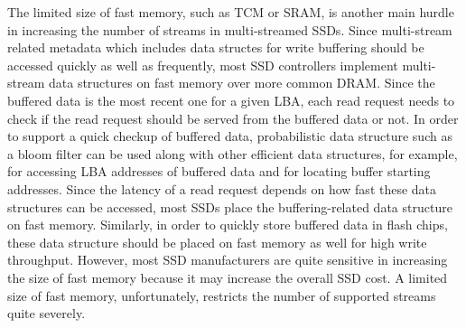 The limited size of fast memory, such as TCM or SRAM, is another main hurdle in increasing 
the number of streams in multi-streamed SSDs.
Since multi-stream related metadata which includes data structes for write buffering 
should be accessed quickly as well as frequently, 
most SSD controllers implement multi-stream data structures on fast memory over more common DRAM. 
Since the buffered data is the 
{\color{blue}
most recent one for a given LBA, each read request needs to check if the read request 
should be served from the buffered data or not.
In order to support a quick checkup of buffered data, probabilistic data structure 
such as a bloom filter can be used along with other efficient data structures, 
for example,  for accessing LBA
addresses of buffered data and for locating buffer starting addresses.   
Since the latency of a read request depends on how fast these data structures 
can be accessed, most SSDs place the
buffering-related data structure on fast memory.   
Similarly, in order to quickly store buffered data in flash chips, these data structure 
should be placed on fast memory as well for high write throughput.
}
However, most SSD manufacturers are quite sensitive in increasing the size of 
fast memory because it may increase the overall SSD cost.   
A limited size of fast memory, unfortunately, restricts the number of
supported streams quite severely.

